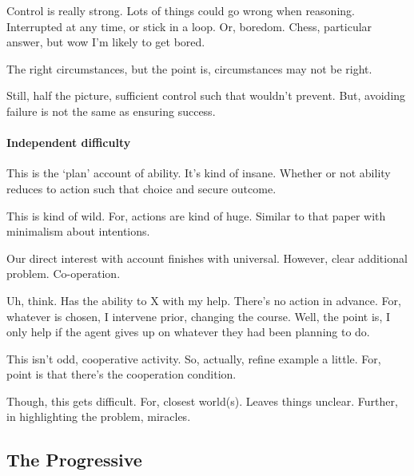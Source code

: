\begin{note}
  Control is really strong.
  Lots of things could go wrong when reasoning.
  Interrupted at any time, or stick in a loop.
  Or, boredom.
  Chess, particular answer, but wow I'm likely to get bored.

  The right circumstances, but the point is, circumstances may not be right.

  Still, half the picture, sufficient control such that wouldn't prevent.
  But, avoiding failure is not the same as ensuring success.
\end{note}

\paragraph{Independent difficulty}

\begin{note}
  This is the `plan' account of ability.
  It's kind of insane.
  Whether or not ability reduces to action such that choice and secure outcome.
\end{note}

\begin{note}
  This is kind of wild.
  For, actions are kind of huge.
  Similar to that paper with minimalism about intentions.
\end{note}

\begin{note}
  Our direct interest with account finishes with universal.
  However, clear additional problem.
  Co-operation.
\end{note}

\begin{note}
  Uh, think.
  Has the ability to X with my help.
  There's no action in advance.
  For, whatever is chosen, I intervene prior, changing the course.
  Well, the point is, I only help if the agent gives up on whatever they had been planning to do.

  This isn't odd, cooperative activity.
  So, actually, refine example a little.
  For, point is that there's the cooperation condition.
\end{note}

\begin{note}
  Though, this gets difficult.
  For, closest world(s).
  Leaves things unclear.
  Further, in highlighting the problem, miracles.
\end{note}

\subsection{The Progressive}

